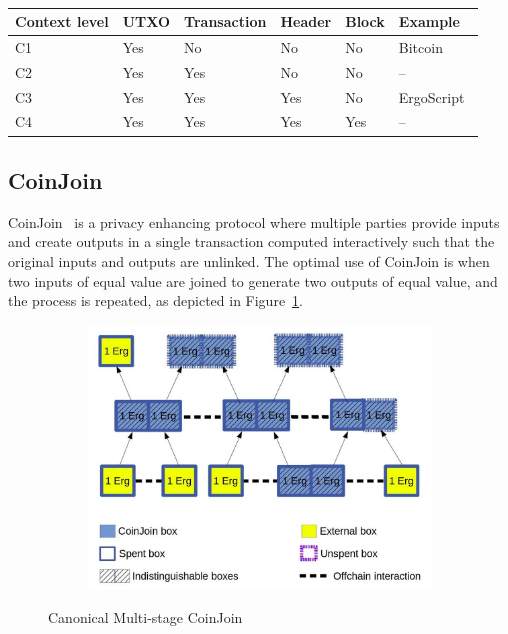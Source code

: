 \documentclass[runningheads]{llncs}
\newcommand{\langname}{ErgoScript\xspace}
\begin{document}
~\\
\begin{tabular}{|l|l|l|l|l|l|}\hline
	Context level & UTXO & Transaction & Header      & Block & Example \\ \hline
	 C1     & Yes  & No          & No  		   & No    & Bitcoin~\cite{Nak08} \\
	 C2     & Yes & Yes         & No 		   & No    & -- \\
	 C3     & Yes & Yes         & Yes 		   & No    & \langname ~\cite{ergo}   \\
	 C4     & Yes & Yes         & Yes 		   & Yes   & --    \\\hline
\end{tabular}

\subsection{CoinJoin} 
\label{coinjoin}
CoinJoin~\cite{coinjoin} is a privacy enhancing protocol where multiple parties provide inputs and create outputs in a single transaction computed interactively such that the original inputs and outputs are unlinked. The optimal use of CoinJoin is when two inputs of equal value are joined to generate two outputs of equal value, and the process is repeated, as depicted in Figure~\ref{fig:coinjoin}. 

\begin{figure}[h]
	\centering
	\begin{subfigure}{.6\textwidth}
		\centering
		\includegraphics[width=\linewidth]{CoinJoin.jpg}
	\end{subfigure}%
	\caption{Canonical Multi-stage CoinJoin}
	\label{fig:coinjoin}
\end{figure}
\end{document}
